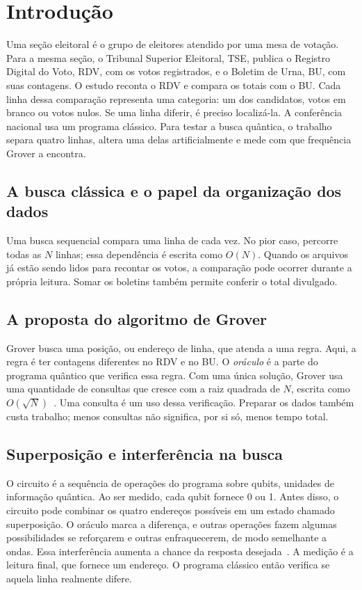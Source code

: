 \documentclass[conference]{IEEEtran}
\begin{document}
\section{Introdução}
Uma seção eleitoral é o grupo de eleitores atendido por uma mesa de votação. Para a mesma seção, o Tribunal Superior Eleitoral, TSE, publica o Registro Digital do Voto, RDV, com os votos registrados, e o Boletim de Urna, BU, com suas contagens. O estudo reconta o RDV e compara os totais com o BU. Cada linha dessa comparação representa uma categoria: um dos candidatos, votos em branco ou votos nulos. Se uma linha diferir, é preciso localizá-la. A conferência nacional usa um programa clássico. Para testar a busca quântica, o trabalho separa quatro linhas, altera uma delas artificialmente e mede com que frequência Grover a encontra.

\subsection{A busca clássica e o papel da organização dos dados}
Uma busca sequencial compara uma linha de cada vez. No pior caso, percorre todas as $N$ linhas; essa dependência é escrita como $O(N)$. Quando os arquivos já estão sendo lidos para recontar os votos, a comparação pode ocorrer durante a própria leitura. Somar os boletins também permite conferir o total divulgado.

\subsection{A proposta do algoritmo de Grover}
Grover busca uma posição, ou endereço de linha, que atenda a uma regra. Aqui, a regra é ter contagens diferentes no RDV e no BU. O \textit{oráculo} é a parte do programa quântico que verifica essa regra. Com uma única solução, Grover usa uma quantidade de consultas que cresce com a raiz quadrada de $N$, escrita como $O(\sqrt{N})$~\cite{grover1996}. Uma consulta é um uso dessa verificação. Preparar os dados também custa trabalho; menos consultas não significa, por si só, menos tempo total.

\subsection{Superposição e interferência na busca}
O circuito é a sequência de operações do programa sobre qubits, unidades de informação quântica. Ao ser medido, cada qubit fornece 0 ou 1. Antes disso, o circuito pode combinar os quatro endereços possíveis em um estado chamado superposição. O oráculo marca a diferença, e outras operações fazem algumas possibilidades se reforçarem e outras enfraquecerem, de modo semelhante a ondas. Essa interferência aumenta a chance da resposta desejada~\cite{boyer1998}. A medição é a leitura final, que fornece um endereço. O programa clássico então verifica se aquela linha realmente difere.
\end{document}
